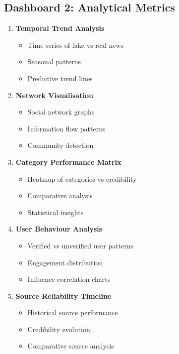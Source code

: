 \documentclass[12pt,a4paper]{article}
\begin{document}
\subsection{Dashboard 2: Analytical Metrics}
\begin{enumerate}
    \item \textbf{Temporal Trend Analysis}
    \begin{itemize}
        \item Time series of fake vs real news
        \item Seasonal patterns
        \item Predictive trend lines
    \end{itemize}
    
    \item \textbf{Network Visualisation}
    \begin{itemize}
        \item Social network graphs
        \item Information flow patterns
        \item Community detection
    \end{itemize}
    
    \item \textbf{Category Performance Matrix}
    \begin{itemize}
        \item Heatmap of categories vs credibility
        \item Comparative analysis
        \item Statistical insights
    \end{itemize}
    
    \item \textbf{User Behaviour Analysis}
    \begin{itemize}
        \item Verified vs unverified user patterns
        \item Engagement distribution
        \item Influence correlation charts
    \end{itemize}
    
    \item \textbf{Source Reliability Timeline}
    \begin{itemize}
        \item Historical source performance
        \item Credibility evolution
        \item Comparative source analysis
    \end{itemize}
\end{enumerate}
\end{document}
